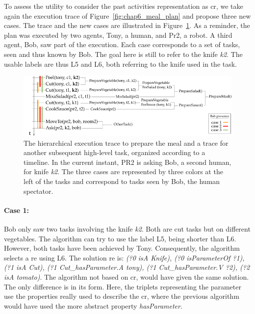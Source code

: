To assess the utility to consider the past activities representation as \acrlong{cr}, we take again the execution trace of Figure~\ref{fig:chap6_meal_plan} and propose three new cases. The trace and the new cases are illustrated in Figure~\ref{fig:chap7_meal_plan}. As a reminder, the plan was executed by two agents, Tony, a human, and Pr2, a robot. A third agent, Bob, saw part of the execution. Each case corresponds to a set of tasks, seen and thus known by Bob. The goal here is still to refer to the knife \textit{k2}. The usable labels are thus L5 and L6, both referring to the knife used in the task.

\begin{figure}[ht!]
\centering
\includegraphics[width=\textwidth]{figures/chapter7/prepare_meal_plan.png}
\caption{\label{fig:chap7_meal_plan} The hierarchical execution trace to prepare the meal and a trace for another subsequent high-level task, organized according to a timeline. In the current instant, PR2 is asking Bob, a second human, for knife \textit{k2}. The three cases are represented by three colors at the left of the tasks and correspond to tasks seen by Bob, the human spectator.}
\end{figure}

\paragraph{Case 1:} Bob only saw two tasks involving the knife \textit{k2}. Both are cut tasks but on different vegetables. The algorithm can try to use the label L5, being shorter than L6. However, both tasks have been achieved by Tony. Consequently, the algorithm selects a \acrshort{re} using L6. The solution \acrshort{re} is: \textit{(?0 isA Knife), (?0 isParameterOf ?1), (?1 isA Cut), (?1 Cut\_hasParameter.A tony), (?1 Cut\_hasParameter.V ?2), (?2 isA tomato)}. The algorithm not based on \acrshort{cr}, would have given the same solution. The only difference is in its form. Here, the triplets representing the parameter use the properties really used to describe the \acrshort{cr}, where the previous algorithm would have used the more abstract property \textit{hasParameter}.

